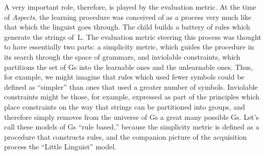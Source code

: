 A very important role, therefore, is played by the evaluation metric. At the time of \emph{Aspects}, the learning procedure was conceived of as a process very much like that which the linguist goes through. The child builds a battery of rules which generate the strings of~L. The evaluation metric steering this process was thought to have essentially two parts: a simplicity metric, which guides the procedure in its search through the space of grammars, and inviolable constraints, which partitions the set of Gs into the learnable ones and the unlearnable ones. Thus, for example, we might imagine that rules which used fewer symbols could be defined as ``simpler'' than ones that used a greater number of symbols. Inviolable constraints might be those, for example, expressed as part of the principles which place constraints on the way that strings can be partitioned into groups, and therefore simply removes from the universe of Gs a great many possible Gs. Let's call these models of Gs ``rule based,'' because the simplicity metric is defined as a procedure that constructs rules, and the companion picture of the acquisition process the ``Little Linguist'' model.

